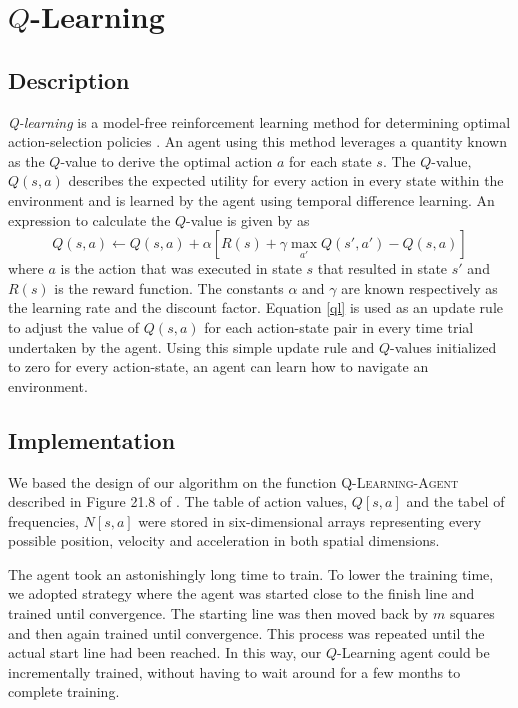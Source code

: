 \documentclass{article}
\begin{document}
	\section{$Q$-Learning}
		\subsection{Description}
			\textit{Q-learning} is a model-free reinforcement learning method for determining optimal action-selection policies \cite{ai}. An agent using this method leverages a quantity known as the $Q$-value to derive the optimal action $a$ for each state $s$. The $Q$-value, $Q(s,a)$ describes the expected utility for every action in every state within the environment and is learned by the agent using temporal difference learning.
			An expression to calculate the $Q$-value is given by \cite{ai} as
			\begin{equation}
				Q(s,a) \leftarrow Q(s,a) + \alpha \left[ R(s) + \gamma \max_{a'} Q(s',a') - Q(s,a) \right]
				\label{ql}
			\end{equation}
			where $a$ is the action that was executed in state $s$ that resulted in state $s'$ and $R(s)$ is the reward function. The constants $\alpha$ and $\gamma$ are known respectively as the learning rate and the discount factor. Equation \ref{ql} is used as an update rule to adjust the value of $Q(s,a)$ for each action-state pair in every time trial undertaken by the agent. Using this simple update rule and $Q$-values initialized to zero for every action-state, an agent can learn how to navigate an environment.
		\subsection{Implementation}
			We based the design of our algorithm on the function \textsc{Q-Learning-Agent} described in Figure 21.8 of \cite{ai}. 
			The table of action values, $Q[s,a]$ and the tabel of frequencies, $N[s,a]$ were stored in six-dimensional arrays representing every possible position, velocity and acceleration in both spatial dimensions.
			
			The agent took an astonishingly long time to train. To lower the training time, we adopted strategy where the agent was started close to the finish line and trained until convergence. The starting line was then moved back by $m$ squares and then again trained until convergence. This process was repeated until the actual start line had been reached. In this way, our $Q$-Learning agent could be incrementally trained, without having to wait around for a few months to complete training.
			
\end{document}

